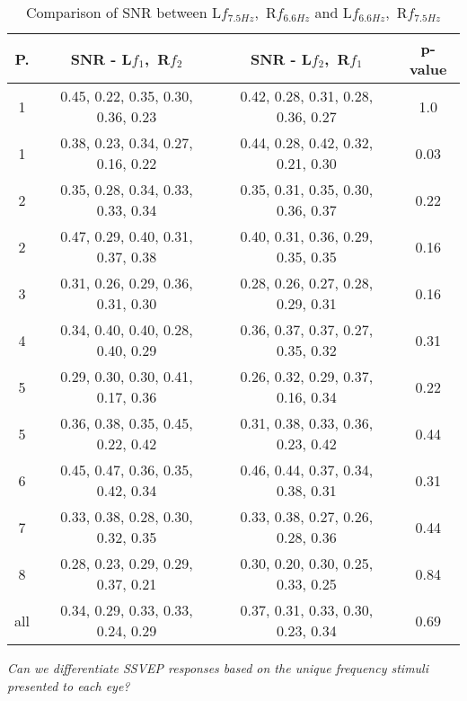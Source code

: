 \begin{table}[htbp]
    \centering
    \begin{tabularx}{\textwidth}{cccc}
        \hline      
        {\textbf{P.}} & {\textbf{SNR - L$f_{1}$,~R$f_{2}$}} & \textbf{SNR - L$f_{2}$,~R$f_{1}$} & \multicolumn{1}{c}{\textbf{p-value}}\\
        \hline
        1 & 0.45, 0.22, 0.35, 0.30, 0.36, 0.23 & 0.42, 0.28, 0.31, 0.28, 0.36, 0.27 &  1.0 \\
1 & 0.38, 0.23, 0.34, 0.27, 0.16, 0.22 & 0.44, 0.28, 0.42, 0.32, 0.21, 0.30 &  0.03 \\
2 & 0.35, 0.28, 0.34, 0.33, 0.33, 0.34 & 0.35, 0.31, 0.35, 0.30, 0.36, 0.37 &  0.22 \\
2 & 0.47, 0.29, 0.40, 0.31, 0.37, 0.38 & 0.40, 0.31, 0.36, 0.29, 0.35, 0.35 &  0.16 \\
3 & 0.31, 0.26, 0.29, 0.36, 0.31, 0.30 & 0.28, 0.26, 0.27, 0.28, 0.29, 0.31 &  0.16 \\
4 & 0.34, 0.40, 0.40, 0.28, 0.40, 0.29 & 0.36, 0.37, 0.37, 0.27, 0.35, 0.32 &  0.31 \\
5 & 0.29, 0.30, 0.30, 0.41, 0.17, 0.36 & 0.26, 0.32, 0.29, 0.37, 0.16, 0.34 &  0.22 \\
5 & 0.36, 0.38, 0.35, 0.45, 0.22, 0.42 & 0.31, 0.38, 0.33, 0.36, 0.23, 0.42 &  0.44 \\
6 & 0.45, 0.47, 0.36, 0.35, 0.42, 0.34 & 0.46, 0.44, 0.37, 0.34, 0.38, 0.31 &  0.31 \\
7 & 0.33, 0.38, 0.28, 0.30, 0.32, 0.35 & 0.33, 0.38, 0.27, 0.26, 0.28, 0.36 &  0.44 \\
8 & 0.28, 0.23, 0.29, 0.29, 0.37, 0.21 & 0.30, 0.20, 0.30, 0.25, 0.33, 0.25 &  0.84 \\
all & 0.34, 0.29, 0.33, 0.33, 0.24, 0.29 & 0.37, 0.31, 0.33, 0.30, 0.23, 0.34 & 0.69 \\
     \hline
    \end{tabularx}
    \caption{Comparison of SNR between L$f_{7.5 Hz}$,~R$f_{6.6 Hz}$ and L$f_{6.6 Hz}$,~R$f_{7.5 Hz}$}
    \emph{Can we differentiate SSVEP responses based on the unique frequency stimuli presented to each eye?}
    \label{tab:rq3c1}
  \end{table}  

